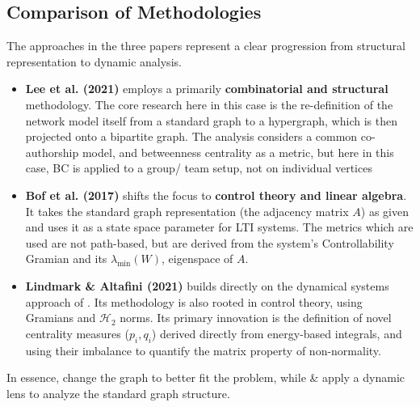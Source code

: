 \documentclass[10pt, a4paper]{article}
\begin{document}
\subsection{Comparison of Methodologies}
The approaches in the three papers represent a clear progression from structural representation to dynamic analysis.
\begin{itemize}
    \item \textbf{Lee et al. (2021)} employs a primarily \textbf{combinatorial and structural} methodology. The core research here in this case is the re-definition of the network model itself from a standard graph to a hypergraph, which is then projected onto a bipartite graph. The analysis considers a common co-authorship model, and betweenness centrality as a metric, but here in this case, BC is applied to a group/ team setup, not on individual vertices

    \item \textbf{Bof et al. (2017)} shifts the focus to \textbf{control theory and linear algebra}. It takes the standard graph representation (the adjacency matrix $A$) as given and uses it as a state space parameter for LTI systems. The metrics which are used are not path-based, but are derived from the system's Controllability Gramian and its $\lambda_{\min}(W)$, eigenspace of $A$.
    
    \item \textbf{Lindmark \& Altafini (2021)} builds directly on the  dynamical systems approach of \cite{Bof2017Role}. Its methodology is also rooted in control theory, using Gramians and $\mathcal{H}_2$ norms. Its primary innovation is the definition of novel centrality measures ($p_i, q_i$) derived directly from energy-based integrals, and using their imbalance to quantify the matrix property of non-normality.
\end{itemize}
In essence,\cite{Lee2021Betweenness} change the graph to better fit the problem, while \cite{Bof2017Role} \& \cite{Lindmark2021Centrality}apply a dynamic lens to analyze the standard graph structure.

    
\end{document}

